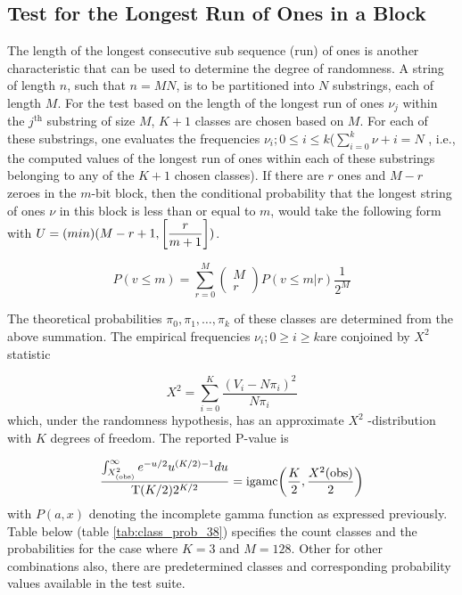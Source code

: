 \subsection{Test for the Longest Run of Ones in a Block}

The length of the longest consecutive sub sequence (run) of ones is another characteristic that can be used to determine the degree of randomness. A string of length $n$, such that $n = MN$, is to be partitioned into $N$ substrings, each of length $M$. For the test based on the length of the longest run of ones $\nu_j$ within the $j^{\text{th}}$ substring of size $M$, $K + 1$ classes are chosen based on $M$. For each of these substrings, one evaluates the frequencies $\nu_i;0\leq i \leq k$($\sum_{i=0}^{k}\nu+i = N$ , i.e., the computed values of the longest run of ones within each of these substrings belonging to any of the $K + 1$ chosen classes). If there are $r$ ones and $M-r$ zeroes in the $m$-bit block, then the conditional probability that the longest string of ones $\nu$ in this block is less than or equal to $m$, would take the following form with $U = \text(min)(M - r + 1, \bigg[\dfrac{r}{m + 1}\bigg])$.

\[
    P(v \leq m) = \sum_{r=0}^{M} \begin{pmatrix}M \\ r\end{pmatrix}P(v \leq m | r) \dfrac{1}{2^M}
\]

The theoretical probabilities $\pi_0, \pi_1, \ldots, \pi_k$ of these classes are determined from the above summation. The empirical frequencies $\nu_i; 0 \geq i \geq k$are conjoined by $X^2$ statistic

\[
    X^2 = \sum_{i=0}^{K} \dfrac{(V_i - N\pi_i)^2}{N\pi_i}
\]
which, under the randomness hypothesis, has an approximate $Χ^2$ -distribution with $K$ degrees of freedom. The reported P-value is

\[
    \dfrac{\int_{X^2_{\text{(obs)}}}^\infty e^{-u/2}u^{(K/2)-1} du}{\mathrm{T}(K/2)2^{K/2}} = \text{igamc}\bigg(\dfrac{K}{2}, \dfrac{X^2(\text{obs})}{2}\bigg)
\]
with $P(a,x)$ denoting the incomplete gamma function as expressed previously. Table below (table \ref{tab:class_prob_38}) specifies the count classes and the probabilities for the case where $K = 3$ and $M = 128$. Other for other combinations also, there are predetermined classes and corresponding probability values available in the test suite.

